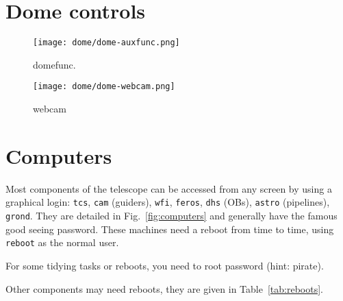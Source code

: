 \documentclass[11pt,fleqn]{book} %
\begin{document}
\section{Dome controls}
\begin{figure}[!ht]
\centering
\texttt{[image: dome/dome-auxfunc.png]}
\caption{\gls{domefunc}.}
\label{fig:domefunc}
\end{figure}

\begin{figure}[!ht]
\centering
  \texttt{[image: dome/dome-webcam.png]}%
\caption{\gls{webcam}}
\label{fig:webcam}
\end{figure}

\section{Computers}
Most components of the telescope can be accessed from any screen by using a graphical login: \texttt{tcs}, \texttt{cam} (guiders), \texttt{wfi}, \texttt{feros}, \texttt{dhs} (OBs), \texttt{astro} (pipelines), \texttt{grond}.  They are detailed in Fig.~\ref{fig:computers} and generally have the famous good seeing password. These machines need a reboot from time to time, using \texttt{reboot} as the normal user. 

For some tidying tasks or reboots, you need to root password (hint: pirate). 

Other components may need reboots, they are given in Table~\ref{tab:reboots}. 
\end{document}
